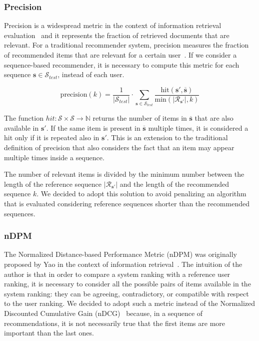 \subsubsection{Precision}
\label{seq:sec:precision}

Precision is a widespread metric in the context of information retrieval evaluation~\cite{Rijsbergen1979} and it represents the fraction of retrieved documents that are relevant. For a traditional recommender system, precision measures the fraction of recommended items that are relevant for a certain user~\cite{Sarwar2000}. If we consider a sequence-based recommender, it is necessary to compute this metric for each sequence $\mathbf{s} \in \mathcal{S}_{test}$, instead of each user.

\begin{equation}
\mathrm{precision}(k) = \frac{1}{|\mathcal{S}_{test}|} \cdot \sum_{\mathbf{s} \in \mathcal{S}_{test}} \frac{\mathrm{hit}(\mathbf{s'}, \mathbf{\overline{s}})}{\mathrm{min}(|\mathcal{R}_{\mathbf{s'}}|, k)}
\end{equation}

The function $hit : \mathcal{S} \times \mathcal{S} \to \mathbb{N}$ returns the number of items in $\mathbf{\overline{s}}$ that are also available in $\mathbf{s'}$. If the same item is present in $\mathbf{\overline{s}}$ multiple times, it is considered a hit only if it is repeated also in $\mathbf{s'}$. This is an extension to the traditional definition of precision that also considers the fact that an item may appear multiple times inside a sequence.

The number of relevant items is divided by the minimum number between the length of the reference sequence $|\mathcal{R}_{\mathbf{s'}}|$ and the length of the recommended sequence $k$. We decided to adopt this solution to avoid penalizing an algorithm that is evaluated considering reference sequences shorter than the recommended sequences.

\subsubsection{nDPM}

The Normalized Distance-based Performance Metric (nDPM) was originally proposed by Yao in the context of information retrieval~\cite{Yao1995}. The intuition of the author is that in order to compare a system ranking with a reference user ranking, it is necessary to consider all the possible pairs of items available in the system ranking: they can be agreeing, contradictory, or compatible with respect to the user ranking. We decided to adopt such a metric instead of the Normalized Discounted Cumulative Gain (nDCG)~\cite{Jaervelin2002} because, in a sequence of recommendations, it is not necessarily true that the first items are more important than the last ones.

